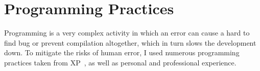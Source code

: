 \section{Programming Practices}\label{sec:programming-practices}

Programming is a very complex activity
in which an error can cause a hard to find bug
or prevent compilation altogether,
which in turn slows the development down.
To mitigate the risks of human error,
I used numerous programming practices
taken from \ac{XP}~\cite{beck_extreme_2004},
as well as personal and professional experience.







